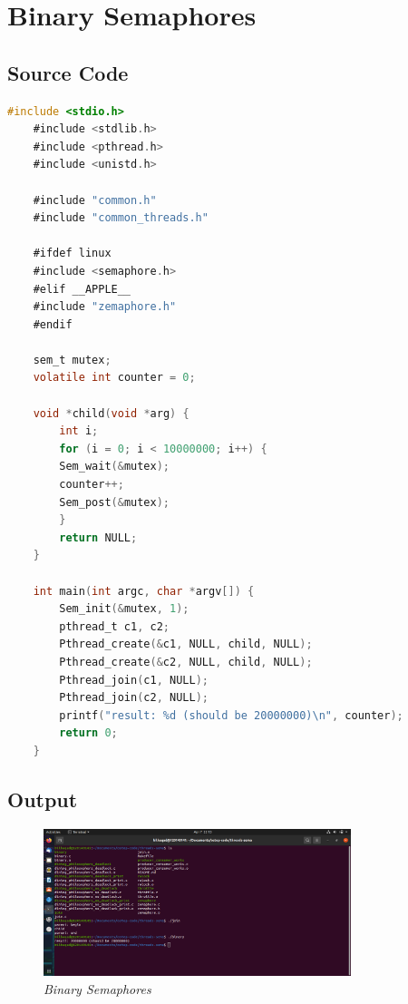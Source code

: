 \documentclass[11pt,a4paper]{article}
\begin{document}
\section{Binary Semaphores}
\subsection{Source Code}
\begin{lstlisting}[language=C]
	#include <stdio.h>
	#include <stdlib.h>
	#include <pthread.h>
	#include <unistd.h>

	#include "common.h"
	#include "common_threads.h"

	#ifdef linux
	#include <semaphore.h>
	#elif __APPLE__
	#include "zemaphore.h"
	#endif

	sem_t mutex;
	volatile int counter = 0;

	void *child(void *arg) {
		int i;
		for (i = 0; i < 10000000; i++) {
		Sem_wait(&mutex);
		counter++;
		Sem_post(&mutex);
		}
		return NULL;
	}

	int main(int argc, char *argv[]) {
		Sem_init(&mutex, 1); 
		pthread_t c1, c2;
		Pthread_create(&c1, NULL, child, NULL);
		Pthread_create(&c2, NULL, child, NULL);
		Pthread_join(c1, NULL);
		Pthread_join(c2, NULL);
		printf("result: %d (should be 20000000)\n", counter);
		return 0;
	}
\end{lstlisting}

\subsection{Output}
\begin{figure}[h]
	\centering
	\includegraphics[width=0.8\textwidth]{Figure1/binary.png}
	\caption{\textit{Binary Semaphores}}
\end{figure}
\end{document}

